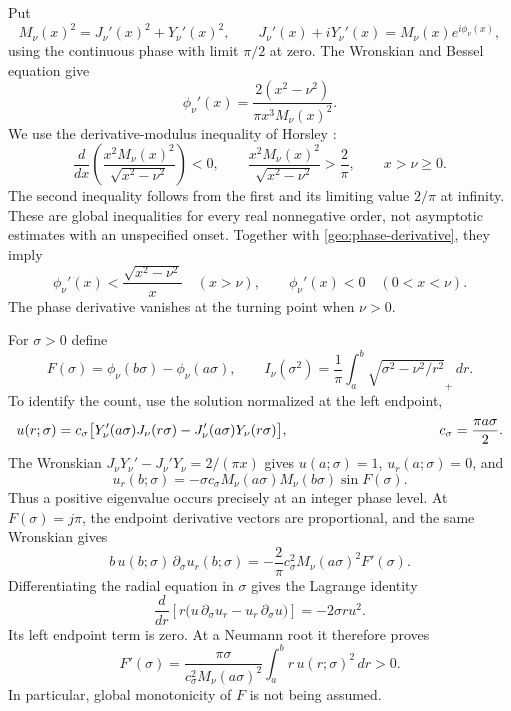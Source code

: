 \documentclass[11pt,reqno]{amsart}
\numberwithin{equation}{section}
\begin{document}
Put
\[
 M_\nu(x)^2=J_\nu'(x)^2+Y_\nu'(x)^2,
 \qquad J_\nu'(x)+iY_\nu'(x)=M_\nu(x)e^{i\phi_\nu(x)},
\]
using the continuous phase with limit $\pi/2$ at zero.  The Wronskian
and Bessel equation give
\begin{equation}\label{geo:phase-derivative}
 \phi_\nu'(x)=\frac{2(x^2-\nu^2)}{\pi x^3M_\nu(x)^2}.
\end{equation}
We use the derivative-modulus inequality of Horsley
\cite[Theorem 2, equation (15), and Section 4, equation (58)]{Horsley2017}:
\begin{equation}\label{geo:horsley}
 \frac d{dx}\left(\frac{x^2M_\nu(x)^2}{\sqrt{x^2-\nu^2}}\right)<0,
 \qquad
 \frac{x^2M_\nu(x)^2}{\sqrt{x^2-\nu^2}}>\frac2\pi,
 \qquad x>\nu\ge0.
\end{equation}
The second inequality follows from the first and its limiting value
$2/\pi$ at infinity.  These are global inequalities for every real
nonnegative order, not asymptotic estimates with an unspecified onset.
Together with \eqref{geo:phase-derivative}, they imply
\begin{equation}\label{geo:phase-speed}
 \phi_\nu'(x)<\frac{\sqrt{x^2-\nu^2}}x\quad(x>\nu),
 \qquad \phi_\nu'(x)<0\quad(0<x<\nu).
\end{equation}
The phase derivative vanishes at the turning point when $\nu>0$.

For $\sigma>0$ define
\[
 F(\sigma)=\phi_\nu(b\sigma)-\phi_\nu(a\sigma),\qquad
 I_\nu(\sigma^2)=\frac1\pi\int_a^b
                       \sqrt{\sigma^2-\nu^2/r^2}_+\,dr.
\]
To identify the count, use the solution normalized at the left endpoint,
\begin{align*}
 u(r;\sigma)&=c_\sigma\bigl[
 Y_\nu'(a\sigma)J_\nu(r\sigma)
             -J_\nu'(a\sigma)Y_\nu(r\sigma)\bigr],
 &\hspace{35mm}c_\sigma=\frac{\pi a\sigma}{2}.
\end{align*}
The Wronskian $J_\nu Y_\nu'-J_\nu'Y_\nu=2/(\pi x)$ gives
$u(a;\sigma)=1$, $u_r(a;\sigma)=0$, and
\[
 u_r(b;\sigma)=-\sigma c_\sigma
       M_\nu(a\sigma)M_\nu(b\sigma)\sin F(\sigma).
\]
Thus a positive eigenvalue occurs precisely at an integer phase level.
At $F(\sigma)=j\pi$, the endpoint derivative vectors are proportional,
and the same Wronskian gives
\[
 b\,u(b;\sigma)\,\partial_\sigma u_r(b;\sigma)
       =-\frac2\pi c_\sigma^2M_\nu(a\sigma)^2F'(\sigma).
\]
Differentiating the radial equation in $\sigma$ gives the Lagrange identity
\[
 \frac d{dr}\left[r\bigl(u\,\partial_\sigma u_r
                  -u_r\,\partial_\sigma u\bigr)\right]
                 =-2\sigma r u^2.
\]
Its left endpoint term is zero.  At a Neumann root it therefore proves
\begin{equation}\label{geo:positive-crossing}
 F'(\sigma)=\frac{\pi\sigma}
  {c_\sigma^2M_\nu(a\sigma)^2}
                 \int_a^b r\,u(r;\sigma)^2\,dr>0.
\end{equation}
In particular, global monotonicity of $F$ is not being assumed.
\end{document}
